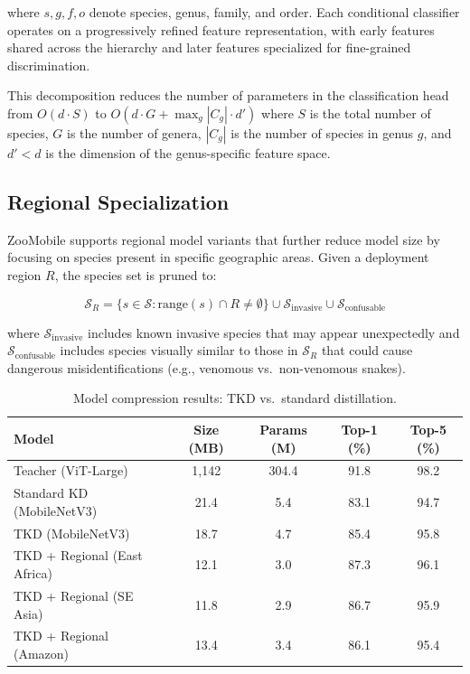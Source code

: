 \documentclass[11pt,a4paper]{article}
\begin{document}
\noindent where $s, g, f, o$ denote species, genus, family, and order.
Each conditional classifier operates on a progressively refined feature representation, with early features shared across the hierarchy and later features specialized for fine-grained discrimination.

This decomposition reduces the number of parameters in the classification head from $O(d \cdot S)$ to $O(d \cdot G + \max_g |C_g| \cdot d')$ where $S$ is the total number of species, $G$ is the number of genera, $|C_g|$ is the number of species in genus $g$, and $d' < d$ is the dimension of the genus-specific feature space.

\subsection{Regional Specialization}

ZooMobile supports regional model variants that further reduce model size by focusing on species present in specific geographic areas.
Given a deployment region $R$, the species set is pruned to:

\begin{equation}
    \mathcal{S}_R = \{s \in \mathcal{S} : \text{range}(s) \cap R \neq \emptyset\} \cup \mathcal{S}_{\text{invasive}} \cup \mathcal{S}_{\text{confusable}}
\end{equation}

\noindent where $\mathcal{S}_{\text{invasive}}$ includes known invasive species that may appear unexpectedly and $\mathcal{S}_{\text{confusable}}$ includes species visually similar to those in $\mathcal{S}_R$ that could cause dangerous misidentifications (e.g., venomous vs.\ non-venomous snakes).

\begin{table}[H]
\centering
\caption{Model compression results: TKD vs.\ standard distillation.}
\label{tab:compression}
\begin{tabular}{@{}lcccc@{}}
\toprule
\textbf{Model} & \textbf{Size (MB)} & \textbf{Params (M)} & \textbf{Top-1 (\%)} & \textbf{Top-5 (\%)} \\
\midrule
Teacher (ViT-Large) & 1,142 & 304.4 & 91.8 & 98.2 \\
Standard KD (MobileNetV3) & 21.4 & 5.4 & 83.1 & 94.7 \\
TKD (MobileNetV3) & 18.7 & 4.7 & 85.4 & 95.8 \\
TKD + Regional (East Africa) & 12.1 & 3.0 & 87.3 & 96.1 \\
TKD + Regional (SE Asia) & 11.8 & 2.9 & 86.7 & 95.9 \\
TKD + Regional (Amazon) & 13.4 & 3.4 & 86.1 & 95.4 \\
\bottomrule
\end{tabular}
\end{table}
\end{document}
